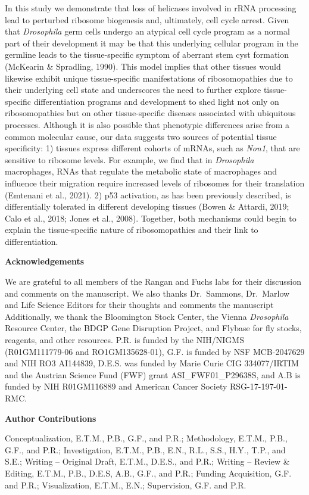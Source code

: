 \documentclass[12pt,twoside]{reedthesis}
\begin{document}
In this study we demonstrate that loss of helicases involved in rRNA
processing lead to perturbed ribosome biogenesis and, ultimately, cell
cycle arrest. Given that \emph{Drosophila} germ cells undergo an atypical
cell cycle program as a normal part of their development it may be that
this underlying cellular program in the germline leads to the
tissue-specific symptom of aberrant stem cyst formation
(McKearin \& Spradling, 1990). This model implies that other tissues would
likewise exhibit unique tissue-specific manifestations of
ribosomopathies due to their underlying cell state and underscores the
need to further explore tissue-specific differentiation programs and
development to shed light not only on ribosomopathies but on other
tissue-specific diseases associated with ubiquitous processes. Although
it is also possible that phenotypic differences arise from a common
molecular cause, our data suggests two sources of potential tissue
specificity: 1) tissues express different cohorts of mRNAs, such as
\emph{Non1}, that are sensitive to ribosome levels. For example, we find that
in \emph{Drosophila} macrophages, RNAs that regulate the metabolic state of
macrophages and influence their migration require increased levels of
ribosomes for their translation (Emtenani et al., 2021).
2) p53 activation, as has been previously described, is differentially
tolerated in different developing tissues
(Bowen \& Attardi, 2019; Calo et al., 2018; Jones et al., 2008). Together, both
mechanisms could begin to explain the tissue-specific nature of
ribosomopathies and their link to differentiation.

\textbf{{Acknowledgements}}

We are grateful to all members of the Rangan and Fuchs labs for their
discussion and comments on the manuscript. We also thanks Dr.~Sammons,
Dr.~Marlow and Life Science Editors for their thoughts and comments the
manuscript Additionally, we thank the Bloomington Stock Center, the
Vienna \emph{Drosophila} Resource Center, the BDGP Gene Disruption Project,
and Flybase for fly stocks, reagents, and other resources. P.R. is
funded by the NIH/NIGMS (R01GM111779-06 and RO1GM135628-01), G.F. is
funded by NSF MCB-2047629 and NIH RO3 AI144839, D.E.S. was funded by
Marie Curie CIG 334077/IRTIM and the Austrian Science Fund (FWF) grant
ASI\_FWF01\_P29638S, and A.B is funded by NIH R01GM116889 and American
Cancer Society RSG-17-197-01-RMC.

\textbf{{Author Contributions}}

Conceptualization, E.T.M., P.B., G.F., and P.R.; Methodology, E.T.M.,
P.B., G.F., and P.R.; Investigation, E.T.M., P.B., E.N., R.L., S.S.,
H.Y., T.P., and S.E.; Writing -- Original Draft, E.T.M., D.E.S., and
P.R.; Writing -- Review \& Editing, E.T.M., P.B., D.E.S, A.B., G.F., and
P.R.; Funding Acquisition, G.F. and P.R.; Visualization, E.T.M., E.N.;
Supervision, G.F. and P.R.
\end{document}
